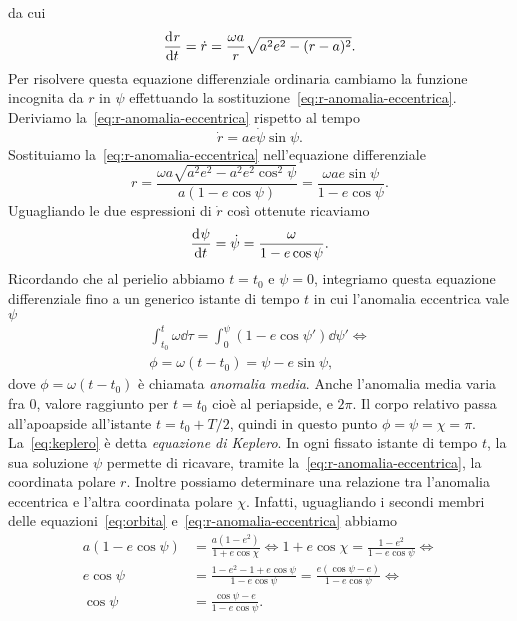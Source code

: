da cui
\begin{equation}
  \frac{{\mathop{}\!\mathrm{d}^{}}r}{\mathop{}\!\mathrm{d} {t}^{}} = \dot{r} = \frac{\omega a}{r}\sqrt{a^2e^2 - (r-a)^2}.
\end{equation}
Per risolvere questa equazione differenziale ordinaria cambiamo la funzione
incognita da $r$ in $\psi$ effettuando la
sostituzione~\eqref{eq:r-anomalia-eccentrica}. Deriviamo
la~\eqref{eq:r-anomalia-eccentrica} rispetto al tempo
\begin{equation}
  \dot{r} = ae\dot{\psi}\sin\psi.
\end{equation}
Sostituiamo la~\eqref{eq:r-anomalia-eccentrica} nell'equazione differenziale
\begin{equation}
  r = \frac{\omega a\sqrt{a^2e^2 - a^2e^2\cos^2\psi}}{a(1-e\cos\psi)} =
  \frac{\omega ae\sin\psi}{1-e\cos\psi}.
\end{equation}
Uguagliando le due espressioni di $\dot{r}$ così ottenute ricaviamo
\begin{equation}
  \frac{{\mathop{}\!\mathrm{d}^{}}\psi}{\mathop{}\!\mathrm{d} {t}^{}} = \dot{\psi} = \frac{\omega}{1-e\cos\psi}.
\end{equation}
Ricordando che al perielio abbiamo $t = t_0$ e $\psi = 0$, integriamo questa
equazione differenziale fino a un generico istante di tempo $t$ in cui
l'anomalia eccentrica vale $\psi$
\begin{gather}
  \int_{t_0}^t \omega\dd \tau = \int_0^\psi(1-e\cos\psi')\dd \psi' \iff\\
  \phi = \omega(t - t_0) = \psi - e\sin\psi, \label{eq:keplero}
\end{gather}
dove $\phi = \omega(t-t_0)$ è chiamata \emph{anomalia media}. Anche l'anomalia
media varia fra $0$, valore raggiunto per $t = t_0$ cioè al periapside, e
$2\pi$. Il corpo relativo passa all'apoapside all'istante $t = t_0 + T/2$,
quindi in questo punto $\phi = \psi = \chi = \pi$. La~\eqref{eq:keplero} è detta
\emph{equazione di Keplero}. In ogni fissato istante di tempo $t$, la sua
soluzione $\psi$ permette di ricavare, tramite
la~\eqref{eq:r-anomalia-eccentrica}, la coordinata polare $r$. Inoltre possiamo
determinare una relazione tra l'anomalia eccentrica e l'altra coordinata polare
$\chi$. Infatti, uguagliando i secondi membri delle equazioni~\eqref{eq:orbita}
e~\eqref{eq:r-anomalia-eccentrica} abbiamo
\begin{equation}
  \begin{aligned}
    a(1-e\cos\psi) &= \frac{a(1-e^2)}{1+e\cos\chi} \iff 1+e\cos\chi =
    \frac{1-e^2}{1-e\cos\psi} \iff \\
    e\cos\psi &= \frac{1-e^2-1+e\cos\psi}{1-e\cos\psi} =
    \frac{e(\cos\psi-e)}{1-e\cos\psi} \iff \\
    \cos\psi &= \frac{\cos\psi-e}{1-e\cos\psi}.
  \end{aligned}
\end{equation}
